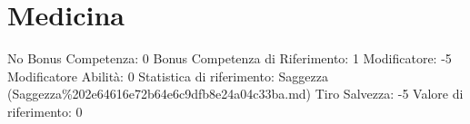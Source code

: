 \section{Medicina}\label{medicina}

\begin{description}
\tightlist
\item[Tags: ABI]
No Bonus Competenza: 0 Bonus Competenza di Riferimento: 1 Modificatore:
-5 Modificatore Abilità: 0 Statistica di riferimento: Saggezza
(Saggezza\%202e64616e72b64e6c9dfb8e24a04c33ba.md) Tiro Salvezza: -5
Valore di riferimento: 0
\end{description}
